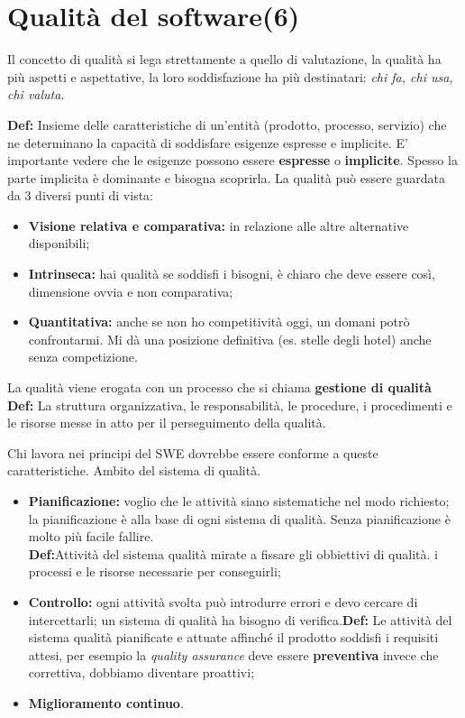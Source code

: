 



\section{Qualità del software(6)}
Il concetto di qualità si lega strettamente a quello di valutazione, la qualità ha più aspetti e aspettative, la loro soddisfazione ha più destinatari: \textit{chi fa, chi usa, chi valuta}.

\textbf{Def:} Insieme delle caratteristiche di un'entità (prodotto, processo, servizio) che ne determinano la capacità di soddisfare esigenze espresse e implicite.
E' importante vedere che le esigenze possono essere \textbf{espresse} o \textbf{implicite}. Spesso la parte implicita è dominante e bisogna scoprirla. La qualità può essere guardata da 3 diversi punti di vista:

\begin{itemize}

	\item \textbf{Visione relativa e comparativa:} in relazione alle altre alternative disponibili;
	\item \textbf{Intrinseca:} hai qualità se soddisfi i bisogni, è chiaro che deve essere così, dimensione ovvia e non comparativa;
	\item \textbf{Quantitativa:} anche se non ho competitività oggi, un domani potrò confrontarmi. Mi dà una posizione definitiva (es. stelle degli hotel) anche senza competizione.

\end{itemize} 

La qualità viene erogata con un processo che si chiama \textbf{gestione di qualità}\\
\textbf{Def:} La struttura organizzativa, le responsabilità, le procedure, i procedimenti e le risorse messe in atto per il perseguimento della qualità.

Chi lavora nei principi del SWE dovrebbe essere conforme a queste caratteristiche. Ambito del sistema di qualità.

\begin{itemize}

	\item \textbf{Pianificazione:} voglio che le attività siano sistematiche nel modo richiesto; la pianificazione è alla base di ogni sistema di qualità. Senza pianificazione è molto più facile fallire. \\
	\textbf{Def:}Attività del sistema qualità mirate a fissare gli obbiettivi di qualità. i processi e le risorse necessarie per conseguirli;
	\item \textbf{Controllo:} ogni attività svolta può introdurre errori e devo cercare di intercettarli; un sistema di qualità ha bisogno di verifica.\textbf{Def:} Le attività del sistema qualità pianificate e attuate affinché il prodotto soddisfi i requisiti attesi, per esempio la \textit{quality assurance} deve essere \textbf{preventiva} invece che correttiva, dobbiamo diventare proattivi;
	\item \textbf{Miglioramento continuo}.

\end{itemize}


